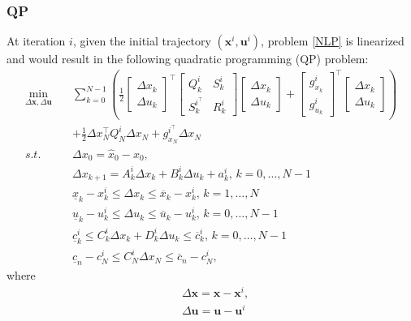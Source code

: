 \documentclass{article}
\begin{document}
\subsubsection{QP}
At iteration $i$, given the initial trajectory $(\mathbf{x}^i,\mathbf{u}^i)$, problem \eqref{NLP} is linearized and would result in the following quadratic programming (QP) problem:
\begin{equation}\label{QP}
\begin{aligned}
\min_{\Delta \mathbf{x},\Delta \mathbf{u}} \quad & \sum_{k=0}^{N-1}( \frac{1}{2}
\begin{bmatrix}
\Delta x_k\\
\Delta u_k
\end{bmatrix}^\top \begin{bmatrix}
Q_k^i & S_k^i \\
S_k^{i^\top} & R_k^i
\end{bmatrix}
\begin{bmatrix}
\Delta x_k\\
\Delta u_k
\end{bmatrix} + \begin{bmatrix}
g_{x_k}^i\\
g_{u_k}^i
\end{bmatrix}^\top
\begin{bmatrix}
\Delta x_k\\
\Delta u_k
\end{bmatrix} ) \\
& + \frac{1}{2}\Delta x_N^\top Q_N^i  \Delta x_N + g_{x_N}^{i^\top}\Delta x_N \\
s.t. \quad & \Delta x_0=\hat{x}_0-x_0,\\
& \Delta x_{k+1}=A_{k}^i \Delta x_{k}+ B_{k}^i \Delta u_{k} +a_{k}^i, \,k=0,\ldots,N-1\\
& \underline{x}_k - x_k^i\leq \Delta x_k\leq \overline{x}_k-x_k^i,\,k=1,\ldots,N\\
& \underline{u}_k - u_k^i\leq \Delta u_k\leq\overline{u}_k-u_k^i,\,k=0,\ldots,N-1\\
& \underline{c}_k^i\leq C_k^i \Delta x_k + D_k^i \Delta u_k\leq \overline{c}_k^i, \,k=0,\ldots,N-1\\
&\underline{c}_n-c_N^i\leq C_N^i \Delta x_N \leq \overline{c}_n-c_N^i, 
\end{aligned}
\end{equation}
where 
\begin{equation}
\begin{aligned}
&\Delta \mathbf{x}=\mathbf{x}-\mathbf{x}^i,\\
&\Delta \mathbf{u}=\mathbf{u}-\mathbf{u}^i
\end{aligned}
\end{equation}
\end{document}
